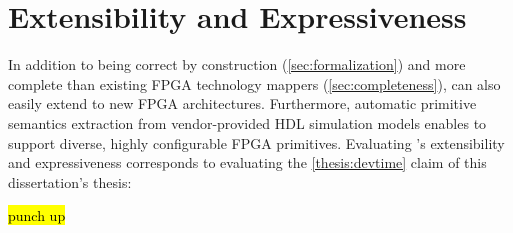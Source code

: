  


\section{\lr Extensibility and Expressiveness}

In addition to being
  correct by construction (\cref{sec:formalization}) and
  more complete 
  than existing FPGA technology mappers (\cref{sec:completeness}),
  \lr can also easily extend to new FPGA architectures.
Furthermore, automatic primitive semantics extraction 
  from vendor-provided HDL simulation models
  enables \lr to support diverse, highly configurable
  FPGA primitives.
Evaluating \lr's extensibility and expressiveness
  corresponds to
  evaluating the \cref{thesis:devtime} claim
  of this dissertation's thesis:
\begin{quote}
    \thesisclaimdevtime
\end{quote}
\hl{punch up}


